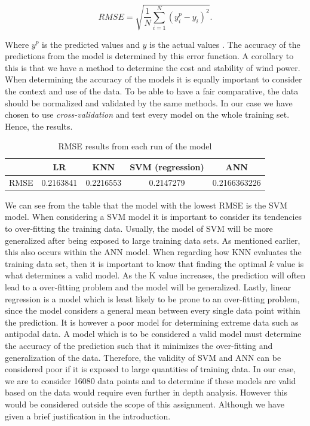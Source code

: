 \documentclass[
11pt, %
english, %
singlespacing, %
parskip, %
headsepline, %
]{report} %
\begin{document}
	   \begin{equation}
	        RMSE = \sqrt{\frac{1}{N}\sum_{i = 1}^{N}(y^{p}_{i} - y_{i})^2}.
	   \end{equation}
	    
	    Where $y^{p}$ is the predicted values and $y$ is the actual values \cite{rmseForm}. The accuracy of the predictions from the model is determined by this error function. A corollary to this is that we have a method to determine the cost and stability of wind power. When determining the accuracy of the models it is equally important to consider the context and use of the data. To be able to have a fair comparative, the data should be normalized and validated by the same methods. In our case we have chosen to use \emph{cross-validation} and test every model on the whole training set. Hence, the results.
        
    \begin{table}[!h]
        \centering
        \begin{tabular}{|c|c|c|c|c|}
            \hline
            & LR & KNN & SVM (regression) & ANN \\
            \hline
            RMSE & 0.2163841 & 0.2216553 & 0.2147279 & 0.2166363226 \\
            \hline
        \end{tabular}
        \caption{RMSE results from each run of the model}
        \label{LR_KNN_SVR_ANN_RMSE_results}
    \end{table}
        
        We can see from the table that the model with the lowest RMSE is the SVM model. When considering a SVM model it is important to consider its tendencies to over-fitting the training data. Usually, the model of SVM will be more generalized after being exposed to large training data sets. As mentioned earlier, this also occurs within the ANN model. When regarding how KNN evaluates the training data set, then it is important to know that finding the optimal $k$ value is what determines a valid model. As the K value increases, the prediction will often lead to a over-fitting problem and the model will be generalized. Lastly, linear regression is a model which is least likely to be prone to an over-fitting problem, since the  model considers a general mean between every single data point within the prediction. It is however a poor model for determining extreme data such as antipodal data. A model which is to be considered a valid model must determine the accuracy of the prediction such that it minimizes the over-fitting and generalization of the data. Therefore, the validity of SVM and ANN can be considered poor if it is exposed to large quantities of training data. In our case, we are to consider 16080 data points and to determine if these models are valid based on the data would require even further in depth analysis. However this would be considered outside the scope of this assignment. Although we have given a brief justification in the introduction.
        
\end{document}
